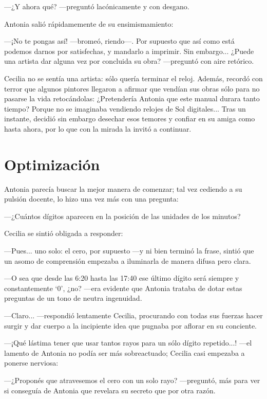 ---¿Y ahora qué? ---preguntó lacónicamente y con desgano.

Antonia salió rápidamemente de su ensimismamiento:

---¡No te pongas así! ---bromeó, riendo---. Por supuesto que así como
está podemos darnos por satisfechas, y mandarlo a imprimir. Sin
embargo... ¿Puede una artista dar alguna vez por concluida su obra?
---preguntó con aire retórico.

Cecilia no se sentía una artista: sólo quería terminar el
reloj. Además, recordó con terror que algunos pintores llegaron a
afirmar que vendían sus obras sólo para no pasarse la vida
retocándolas: ¿Pretendería Antonia que este manual durara tanto
tiempo?  Porque no se imaginaba vendiendo relojes de Sol
digitales... Tras un instante, decidió sin embargo desechar esos
temores y confiar en su amiga como hasta ahora, por lo que con la
mirada la invitó a continuar.

\section{Optimización}


Antonia parecía buscar la mejor manera de comenzar; tal vez cediendo a
su pulsión docente, lo hizo una vez más con una pregunta:

---¿Cuántos dígitos aparecen en la posición de las unidades de los
minutos?

Cecilia se sintió obligada a responder:

---Pues... uno solo: el cero, por supuesto ---y ni bien terminó la
frase, sintió que un asomo de comprensión empezaba a iluminarla de
manera difusa pero clara.

---O sea que desde las 6:20 hasta las 17:40 ese último dígito será
siempre y constantemente `0', ¿no? ---era evidente que Antonia trataba
de dotar estas preguntas de un tono de neutra ingenuidad.

---Claro... ---respondió lentamente Cecilia, procurando con todas sus
fuerzas hacer surgir y dar cuerpo a la incipiente idea que pugnaba por
aflorar en su conciente.

---¡Qué lástima tener que usar tantos rayos para un sólo dígito
repetido...! ---el lamento de Antonia no podía ser más sobreactuado;
Cecilia casi empezaba a ponerse nerviosa:

---¿Proponés que atravesemos el cero con un solo rayo?
---pre\-gun\-tó, más para ver si conseguía de Antonia que revelara su
secreto que por otra razón.

